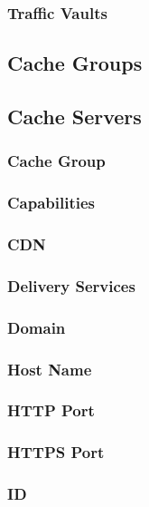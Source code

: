 \subsubsection{Traffic Vaults}



\subsection{Cache Groups}



\subsection{Cache Servers}

\subsubsection{Cache Group}

\subsubsection{Capabilities}

\subsubsection{CDN}

\subsubsection{Delivery Services}

\subsubsection{Domain}

\subsubsection{Host Name}

\subsubsection{HTTP Port}

\subsubsection{HTTPS Port}

\subsubsection{ID}

